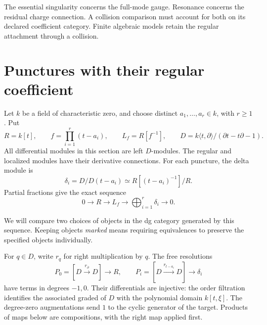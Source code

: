 The essential singularity concerns the full-mode gauge.
Resonance concerns the residual charge connection.
A collision comparison must account for both on its
declared coefficient category. Finite algebraic models
retain the regular attachment through a collision.

\section{Punctures with their regular coefficient}
\label{cbc:ac:punctures}

Let $k$ be a field of characteristic zero, and choose distinct
$a_1,\ldots,a_r\in k$, with $r\geq1$. Put
\[
 R=k[t],\qquad f=\prod_{i=1}^r(t-a_i),\qquad
 L_f=R[f^{-1}],\qquad
 D=k\langle t,\partial\rangle/(\partial t-t\partial-1).
\]
All differential modules in this section are left $D$-modules.
The regular and localized modules have their derivative
connections. For each puncture, the delta module is
\[
 \delta_i=D/D(t-a_i)
              \simeq R[(t-a_i)^{-1}]/R.
\]
Partial fractions give the exact sequence
\begin{equation}\label{cbc:ac:puncture-extension}
 0\longrightarrow R\longrightarrow L_f
                 \longrightarrow\bigoplus_{i=1}^r\delta_i
                 \longrightarrow0.
\end{equation}

We will compare two choices of objects in the dg category
generated by this sequence. Keeping objects \emph{marked}
means requiring equivalences to preserve the specified
objects individually.

For $q\in D$, write $r_q$ for right multiplication by $q$.
The free resolutions
\begin{equation}\label{cbc:ac:normal-resolutions}
 P_0=[D\xrightarrow{r_\partial}D]\longrightarrow R,\qquad
 P_i=[D\xrightarrow{r_{t-a_i}}D]\longrightarrow\delta_i
\end{equation}
have terms in degrees $-1,0$. Their differentials are
injective: the order filtration identifies the associated
graded of $D$ with the polynomial domain $k[t,\xi]$.
The degree-zero augmentations send $1$ to the cyclic
generator of the target. Products of maps below are
compositions, with the right map applied first.


